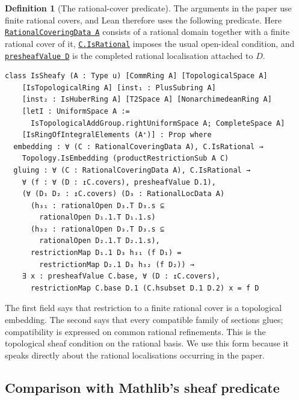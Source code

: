 \documentclass[11pt,reqno]{amsart}
\theoremstyle{definition}
\newtheorem{definition}[definition]{Definition}
\begin{document}
\begin{definition}[The rational-cover predicate]
\label{def:lean-rational-sheafiness}
The arguments in the paper use finite rational covers, and Lean therefore uses
the following predicate.  Here
\href{https://cbirkbeck.github.io/uniform-sheafy-tate-domains/lean/AdicSpaces/declarations/ValuationSpectrum.RationalCoveringData.html}{\texttt{RationalCoveringData A}}
consists of a rational domain together with a finite rational cover of it,
\href{https://cbirkbeck.github.io/uniform-sheafy-tate-domains/lean/AdicSpaces/declarations/ValuationSpectrum.RationalCoveringData.IsRational.html}{\texttt{C.IsRational}}
imposes the usual open-ideal condition, and
\href{https://cbirkbeck.github.io/uniform-sheafy-tate-domains/lean/AdicSpaces/declarations/ValuationSpectrum.presheafValue.html}{\texttt{presheafValue D}}
is the completed rational localisation attached to \(D\).

\begin{lstlisting}
class IsSheafy (A : Type u) [CommRing A] [TopologicalSpace A]
    [IsTopologicalRing A] [inst₁ : PlusSubring A]
    [inst₂ : IsHuberRing A] [T2Space A] [NonarchimedeanRing A]
    [letI : UniformSpace A :=
      IsTopologicalAddGroup.rightUniformSpace A; CompleteSpace A]
    [IsRingOfIntegralElements (A⁺)] : Prop where
  embedding : ∀ (C : RationalCoveringData A), C.IsRational →
    Topology.IsEmbedding (productRestrictionSub A C)
  gluing : ∀ (C : RationalCoveringData A), C.IsRational →
    ∀ (f : ∀ (D : ↥C.covers), presheafValue D.1),
    (∀ (D₁ D₂ : ↥C.covers) (D₃ : RationalLocData A)
      (h₃₁ : rationalOpen D₃.T D₃.s ⊆
        rationalOpen D₁.1.T D₁.1.s)
      (h₃₂ : rationalOpen D₃.T D₃.s ⊆
        rationalOpen D₂.1.T D₂.1.s),
      restrictionMap D₁.1 D₃ h₃₁ (f D₁) =
        restrictionMap D₂.1 D₃ h₃₂ (f D₂)) →
    ∃ x : presheafValue C.base, ∀ (D : ↥C.covers),
      restrictionMap C.base D.1 (C.hsubset D.1 D.2) x = f D
\end{lstlisting}

The first field says that restriction to a finite rational cover is a
topological embedding.  The second says that every compatible family of
sections glues; compatibility is expressed on common rational refinements.
This is the topological sheaf condition on the rational basis.  We use this
form because it speaks directly about the rational localisations occurring in
the paper.
\end{definition}

\subsection{Comparison with Mathlib's sheaf predicate}
\end{document}
